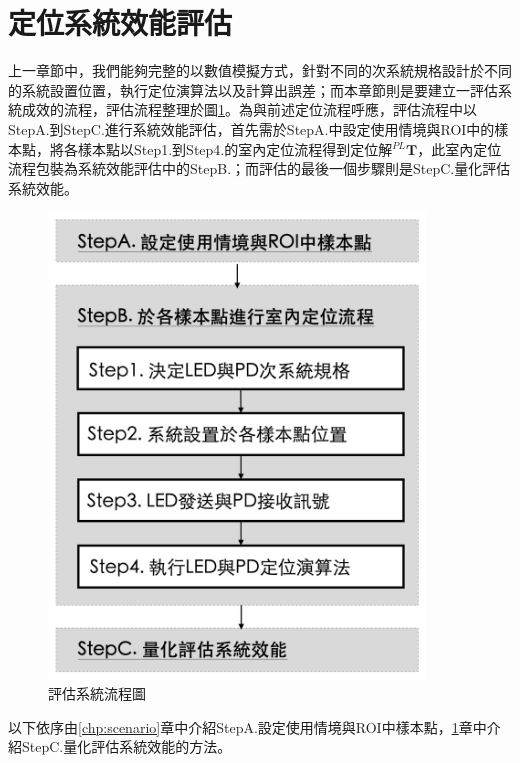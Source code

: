 \newpage

\section{定位系統效能評估}
\label{chp:system_evaluate}

上一章節中，我們能夠完整的以數值模擬方式，針對不同的次系統規格設計於不同的系統設置位置，執行定位演算法以及計算出誤差；而本章節則是要建立一評估系統成效的流程，評估流程整理於圖\ref{pic:evaluate_flow}。為與前述定位流程呼應，評估流程中以StepA.到StepC.進行系統效能評估，首先需於StepA.中設定使用情境與ROI中的樣本點，將各樣本點以Step1.到Step4.的室內定位流程得到定位解$^{PL}\boldsymbol{T}$，此室內定位流程包裝為系統效能評估中的StepB.；而評估的最後一個步驟則是StepC.量化評估系統效能。


\begin{figure}[htpb]
    \centering
    \includegraphics[width=10cm]{ch4pic/evaluate_flow.png}
    \caption{評估系統流程圖}
    \label{pic:evaluate_flow}
\end{figure}


以下依序由\ref{chp:scenario}章中介紹StepA.設定使用情境與ROI中樣本點，\ref{chp:system_evaluate}章中介紹StepC.量化評估系統效能的方法。







